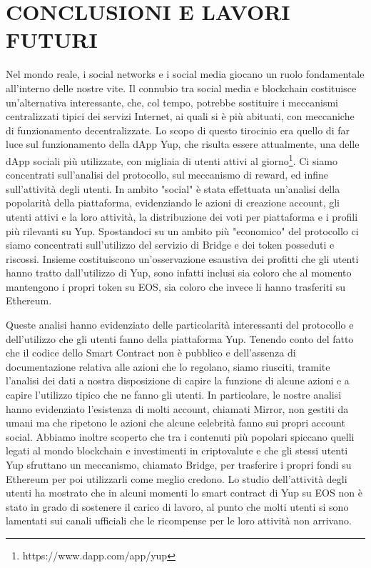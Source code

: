 \chapter{CONCLUSIONI E LAVORI FUTURI}
Nel mondo reale, i social networks e i social media giocano un ruolo fondamentale all'interno delle nostre vite. Il connubio tra social media e blockchain costituisce un’alternativa interessante, che, col tempo, potrebbe sostituire i meccanismi centralizzati tipici dei servizi Internet, ai quali si è più abituati, con meccaniche di funzionamento decentralizzate.
Lo scopo di questo tirocinio era quello di far luce sul funzionamento della dApp Yup, che risulta essere attualmente, una delle dApp sociali più utilizzate, con migliaia di utenti attivi al giorno\footnote{https://www.dapp.com/app/yup}. Ci siamo concentrati sull'analisi del protocollo, sul meccanismo di reward, ed infine sull'attività degli utenti. 
In ambito "social" è stata effettuata un'analisi della popolarità della piattaforma, evidenziando le azioni di creazione account, gli utenti attivi e la loro attività, la distribuzione dei voti per piattaforma e i profili più rilevanti su Yup. Spostandoci su un ambito più "economico" del protocollo ci siamo concentrati sull'utilizzo del servizio di Bridge e dei token posseduti e riscossi. Insieme costituiscono un'osservazione esaustiva dei profitti che gli utenti hanno tratto dall'utilizzo di Yup, sono infatti inclusi sia coloro che al momento mantengono i propri token su EOS, sia coloro che invece li hanno trasferiti su Ethereum.

Queste analisi hanno evidenziato delle particolarità interessanti del protocollo e dell'utilizzo che gli utenti fanno della piattaforma Yup. Tenendo conto del fatto che il codice dello Smart Contract non è pubblico e dell'assenza di documentazione relativa alle azioni che lo regolano, siamo riusciti, tramite l'analisi dei dati a nostra disposizione di capire la funzione di alcune azioni e a capire l'utilizzo tipico che ne fanno gli utenti.
In particolare, le nostre analisi hanno evidenziato l'esistenza di molti account, chiamati Mirror, non gestiti da umani ma che ripetono le azioni che alcune celebrità fanno sui propri account social.
Abbiamo inoltre scoperto che tra i contenuti più popolari spiccano quelli legati al mondo blockchain e investimenti in criptovalute e che gli stessi utenti Yup sfruttano un meccanismo, chiamato Bridge, per trasferire i propri fondi su Ethereum per poi utilizzarli come meglio credono.
Lo studio dell'attività degli utenti ha mostrato che in alcuni momenti lo smart contract di Yup su EOS non è stato in grado di sostenere il carico di lavoro, al punto che molti utenti si sono lamentati sui canali ufficiali che le ricompense per le loro attività non arrivano.

